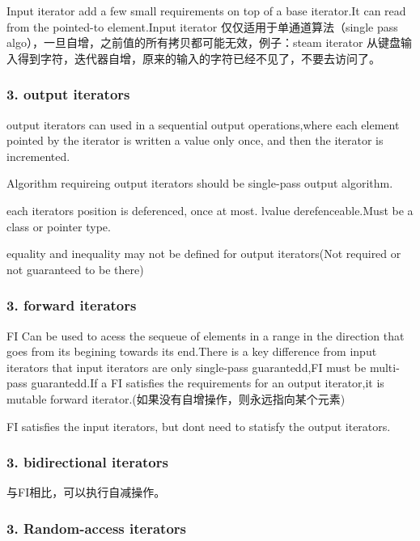Input iterator add a few small requirements on top of a base iterator.\+It can read from the pointed-\/to element.\+Input iterator 仅仅适用于单通道算法（single pass algo），一旦自增，之前值的所有拷贝都可能无效，例子：steam iterator 从键盘输入得到字符，迭代器自增，原来的输入的字符已经不见了，不要去访问了。

\subsubsection*{3. output iterators}

output iterators can used in a sequential output operations,where each element pointed by the iterator is written a value only once, and then the iterator is incremented.

Algorithm requireing output iterators should be single-\/pass output algorithm.


\begin{DoxyItemize}
\item each iterator\textquotesingle{}s position is deferenced, once at most. lvalue derefenceable.\+Must be a class or pointer type.
\item equality and inequality may not be defined for output iterators(\+Not required or not guaranteed to be there)
\end{DoxyItemize}

\subsubsection*{3. forward iterators}

FI Can be used to acess the sequeue of elements in a range in the direction that goes from its begining towards its end.\+There is a key difference from input iterators that input iterators are only single-\/pass guarantedd,FI must be multi-\/pass guarantedd.\+If a FI satisfies the requirements for an output iterator,it is mutable forward iterator.(如果没有自增操作，则永远指向某个元素)

FI satisfies the input iterators, but don\textquotesingle{}t need to statisfy the output iterators.

\subsubsection*{3. bidirectional iterators}

与\+F\+I相比，可以执行自减操作。

\subsubsection*{3. Random-\/access iterators}

